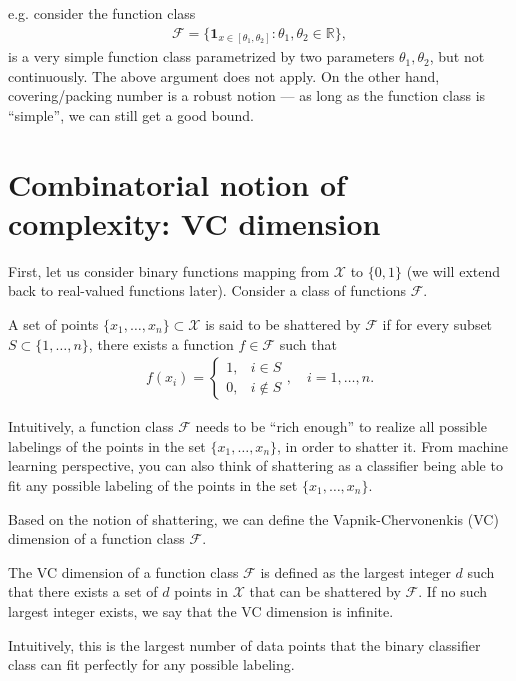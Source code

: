 \documentclass[11pt,letterpaper]{article}
\numberwithin{theorem}{lecture}
\numberwithin{proposition}{lecture}
\numberwithin{lemma}{lecture}
\numberwithin{claim}{lecture}
\numberwithin{corollary}{lecture}
\numberwithin{definition}{lecture}
\numberwithin{conjecture}{lecture}
\numberwithin{remark}{lecture}
\numberwithin{example}{lecture}
\numberwithin{equation}{lecture}
\begin{document}
e.g. consider the function class
\begin{align*}
  \mathcal{F} = \Big\{ \bm{1}_{x \in [\theta_1, \theta_2]}: \theta_1, \theta_2 \in \mathbb{R} \Big\},
\end{align*}
is a very simple function class parametrized by two parameters $\theta_1, \theta_2$, but not continuously. The above argument does not apply. On the other hand, covering/packing number is a robust notion --- as long as the function class is ``simple'', we can still get a good bound.

\section{Combinatorial notion of complexity: VC dimension}
First, let us consider binary functions mapping from $\mathcal{X}$ to $\{0, 1\}$ (we will extend back to real-valued functions later). Consider a class of functions $\mathcal{F}$.

\begin{definition}[shattering]
  A set of points $\{x_1, \ldots, x_n\} \subset \mathcal{X}$ is said to be shattered by $\mathcal{F}$ if for every subset $S \subset \{1, \ldots, n\}$, there exists a function $f \in \mathcal{F}$ such that
  \begin{align*}
    f (x_i) = \begin{cases}
      1, & i \in S\\
      0, & i \notin S
    \end{cases}, \quad i = 1, \ldots, n.
  \end{align*}
\end{definition}
Intuitively, a function class $\mathcal{F}$ needs to be ``rich enough'' to realize all possible labelings of the points in the set $\{x_1, \ldots, x_n\}$, in order to shatter it. From machine learning perspective, you can also think of shattering as a classifier being able to fit any possible labeling of the points in the set $\{x_1, \ldots, x_n\}$.

Based on the notion of shattering, we can define the Vapnik-Chervonenkis (VC) dimension of a function class $\mathcal{F}$.
\begin{definition}[VC dimension]
  The VC dimension of a function class $\mathcal{F}$ is defined as the largest integer $d$ such that there exists a set of $d$ points in $\mathcal{X}$ that can be shattered by $\mathcal{F}$. If no such largest integer exists, we say that the VC dimension is infinite.
\end{definition}
Intuitively, this is the largest number of data points that the binary classifier class can fit perfectly for any possible labeling.
\end{document}
